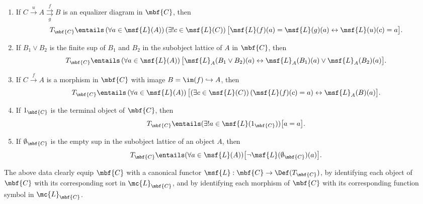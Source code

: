 \documentclass[11pt]{article}
\begin{document}
{\begin{enumerate}
\begin{enumerate}
\item If $C \overset{u}{\to} A \overset{f}{\underset{g}{\rightrightarrows}} B$ is an equalizer diagram in $\mbf{C}$, then
  $$
T_{\mbf{C}} \entails \left(\forall a \in \msf{L}(A) \right) \left(\exists! c \in \msf{L}(C)\right) \bigl[\msf{L}(f)(a) = \msf{L}(g)(a) \leftrightarrow \msf{L}(u)(c) = a\bigr].
$$
\item If $B_1 \lor B_2$ is the finite sup of $B_1$ and $B_2$ in the subobject lattice of $A$ in $\mbf{C}$, then
  $$
T_{\mbf{C}} \entails \left(\forall a \in \msf{L}(A)\right) \bigl[\msf{L}_A(B_1 \lor B_2)(a) \leftrightarrow \msf{L}_A(B_1)(a) \lor \msf{L}_A(B_2)(a)\bigr].
$$
\item If $C \overset{f}{\to} A$ is a morphism in $\mbf{C}$ with image $B = \im(f) \hookrightarrow A$, then
  $$
T_{\mbf{C}} \entails \left(\forall a \in \msf{L}(A) \right) \bigl[ \left(\exists c \in \msf{L}(C)\right)\left(\msf{L}(f)(c) = a \right) \leftrightarrow \msf{L}_A(B)(a)\bigr].
$$
\item If $1_{\mbf{C}}$ is the terminal object of $\mbf{C}$, then
  $$
T_{\mbf{C}} \entails (\exists! a \in \msf{L}(1_{\mbf{C}})) \bigl[a = a\bigr].
$$
\item If $\emptyset_{\mbf{C}}$ is the empty sup in the subobject lattice of an object $A$, then
  $$
T_{\mbf{C}} \entails (\forall a \in \msf{L}(A)) \bigl[\neg \msf{L}(\emptyset_{\mbf{C}})(a)\bigr].
  $$
      \end{enumerate}
  \end{enumerate}
}

  The above data clearly equip $\mbf{C}$ with a canonical functor $\msf{L} : \mbf{C} \to \Def(T_{\mbf{C}})$, by identifying each object of $\mbf{C}$ with its corresponding sort in $\mc{L}_{\mbf{C}}$, and by identifying each morphism of $\mbf{C}$ with its corresponding function symbol in $\mc{L}_{\mbf{C}}$.

\end{document}
